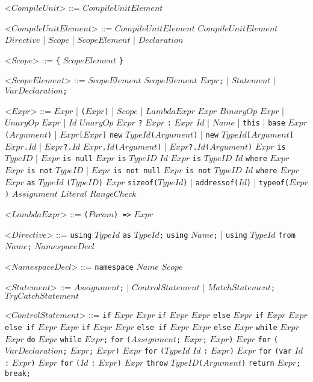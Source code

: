 \documentclass{article}
\newcommand{\gtext}[1]{<$#1$>}
\newcommand{\glit}[1]{\texttt{#1}}
\begin{document}
\begin{grammar}

	\gtext{CompileUnit} ::= $CompileUnitElement$

	\gtext{CompileUnitElement} ::= $CompileUnitElement$ $CompileUnitElement$
	\alt $Directive$ | $Scope$ | $ScopeElement$ | $Declaration$

	\gtext{Scope} ::= \glit{\{} $ScopeElement$ \glit{\}}
	
	\gtext{ScopeElement} ::= $ScopeElement$ $ScopeElement$
	\alt $Expr$\glit{;} | $Statement$	| $VarDeclaration$\glit{;}
	
	\gtext{Expr} ::= $Expr$ | \glit{(}$Expr$\glit{)} | $Scope$ | $LambdaExpr$
	\alt $Expr$ $BinaryOp$ $Expr$ | $UnaryOp$ $Expr$ | $Id$ $UnaryOp$
	\alt $Expr$ \glit{?} $Expr$ \glit{:} $Expr$
	\alt $Id$ | $Name$ | \glit{this} | \glit{base}
	\alt $Expr$\glit{(}$Argument$\glit{)} | $Expr$\glit{[}$Expr$\glit{]}
	\alt \glit{new} $TypeId$\glit{(}$Argument$\glit{)} | \glit{new} $TypeId$\glit{[}$Argument$\glit{]}
	\alt $Expr$\glit{.}$Id$ | $Expr$\glit{?.}$Id$ 
	\alt $Expr$\glit{.}$Id$\glit{(}$Argument$\glit{)} | $Expr$\glit{?.}$Id$\glit{(}$Argument$\glit{)}
	\alt $Expr$ \glit{is} $TypeID$ | $Expr$ \glit{is null} $Expr$ \glit{is} $TypeID$ $Id$
	\alt $Expr$ \glit{is} $TypeID$ $Id$ \glit{where} $Expr$
	\alt $Expr$ \glit{is not} $TypeID$ | $Expr$ \glit{is not null}
	\alt $Expr$ \glit{is not} $TypeID$ $Id$ \glit{where} $Expr$ %
	\alt $Expr$ \glit{as} $TypeId$
	\alt \glit{(}$TypeID$\glit{)} $Expr$
	\alt \glit{sizeof($TypeId$}\glit{)} | \glit{addressof($Id$}\glit{)} | \glit{typeof($Expr$}\glit{)}
	\alt $Assignment$
	\alt $Literal$
	\alt $RangeCheck$
	
	\gtext{LambdaExpr} ::= \glit{(}$Param$\glit{) =>} $Expr$
	
	\gtext{Directive} ::= \glit{using} $TypeId$ \glit{as} $TypeId$\glit{;}
	\alt \glit{using} $Name$\glit{;} | \glit{using} $TypeId$ \glit{from} $Name$\glit{;}
	\alt $NamespaceDecl$

	\gtext{NamespaceDecl} ::= \glit{namespace} $Name$ $Scope$
	
	\gtext{Statement} ::= $Assignment$\glit{;} | $ControlStatement$ | $MatchStatement$\glit{;}
	\alt $TryCatchStatement$
	
	\newpage	
	
	\gtext{ControlStatement} ::= \glit{if} $Expr$ $Expr$
	\alt \glit{if} $Expr$ $Expr$ \glit{else} $Expr$
	\alt \glit{if} $Expr$ $Expr$ \glit{else if} $Expr$ $Expr$
	\alt \glit{if} $Expr$ $Expr$ \glit{else if} $Expr$ $Expr$ \glit{else} $Expr$
	\alt \glit{while} $Expr$ $Expr$
	\alt \glit{do} $Expr$ \glit{while} $Expr$\glit{;}
	\alt \glit{for} \glit{(}$Assignment$\glit{;} $Expr$\glit{;} $Expr$\glit{)} $Expr$
	\alt \glit{for} \glit{(}$VarDeclaration$\glit{;} $Expr$\glit{;} $Expr$\glit{)} $Expr$
	\alt \glit{for} \glit{(}$TypeId$ $Id$ \glit{:} $Expr$\glit{)} $Expr$
	\alt \glit{for} \glit{(var} $Id$ \glit{:} $Expr$\glit{)} $Expr$
	\alt \glit{for} \glit{(}$Id$ \glit{:} $Expr$\glit{)} $Expr$ %
	\alt \glit{throw} $TypeID$\glit{(}$Argument$\glit{)}
	\alt \glit{return} $Expr$\glit{;}
	\alt \glit{break;}
	

\end{grammar}
\end{document}
